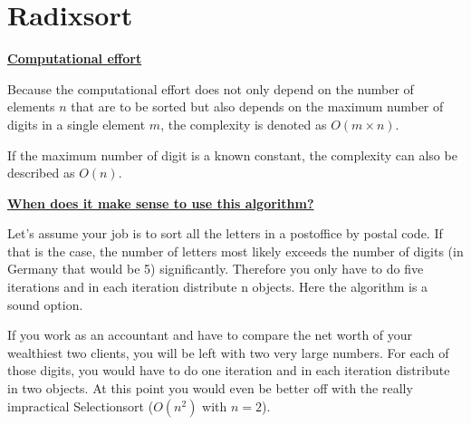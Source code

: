 \documentclass[a4paper]{report}
\begin{document}
\chapter*{Radixsort}

\underline{\bf{Computational effort}}

Because the computational effort does not only depend on the number of elements $n$ that are to be sorted but also depends on the maximum number of digits in a single element $m$, the complexity is denoted as $O(m \times n)$.

If the maximum number of digit is a known constant, the complexity can also be described as $O(n)$.

\underline{\bf{When does it make sense to use this algorithm?}}

Let's assume your job is to sort all the letters in a postoffice by postal code. If that is the case, the number of letters most likely exceeds the number of digits (in Germany that would be 5) significantly. Therefore you only have to do five iterations and in each iteration distribute n objects. Here the algorithm is a sound option.

If you work as an accountant and have to compare the net worth of your wealthiest two clients, you will be left with two very large numbers. For each of those digits, you would have to do one iteration and in each iteration distribute in two objects. At this point you would even be better off with the really impractical Selectionsort ($O(n^2)$ with $n=2$).
\end{document}
